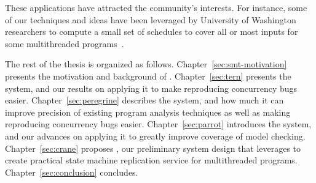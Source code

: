 These \smt applications have attracted the community's interests. For instance,
some of our \smt techniques and ideas have been leveraged by University of
Washington researchers to compute a small set of schedules to cover all or most
inputs for some multithreaded programs~\cite{bergan:oopsla13}.

The rest of the thesis is organized as follows. Chapter~\ref{sec:smt-motivation}
presents the motivation and background of \smt. Chapter~\ref{sec:tern} presents
the \tern system, and our results on applying it to make reproducing concurrency
bugs easier. Chapter~\ref{sec:peregrine} describes the \peregrine system, and
how much it can improve precision of existing program analysis techniques as
well as making reproducing concurrency bugs easier. Chapter~\ref{sec:parrot}
introduces the \parrot system, and our advances on applying it to greatly
improve coverage of model checking. Chapter~\ref{sec:crane} proposes \crane, our
preliminary system design that leverages \smt to create practical
state machine replication service for multithreaded programs.
Chapter~\ref{sec:conclusion} concludes.



